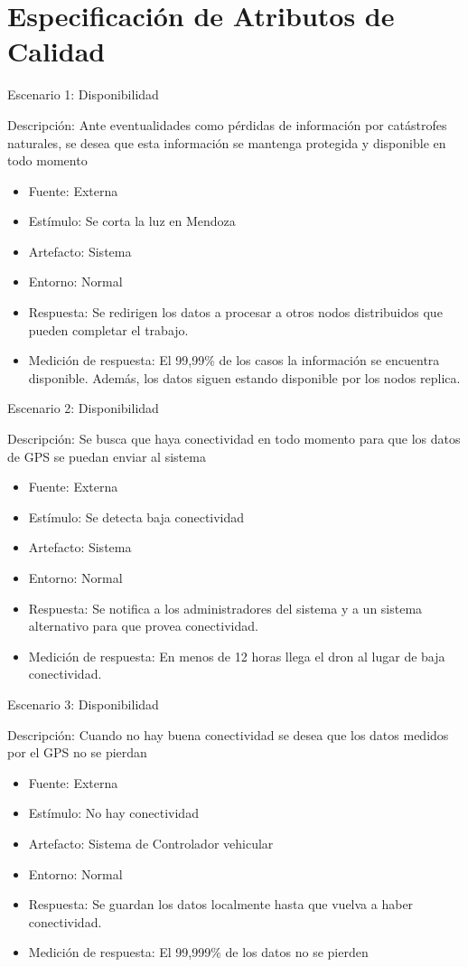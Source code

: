 \section{Especificación de Atributos de Calidad}

Escenario 1: Disponibilidad


Descripción: Ante eventualidades como pérdidas de información por catástrofes 
naturales, se desea que esta información se mantenga protegida y disponible en 
todo momento
\begin{itemize}
\item Fuente: Externa
\item Estímulo: Se corta la luz en Mendoza
\item Artefacto: Sistema
\item Entorno: Normal
\item Respuesta: Se redirigen los datos a procesar a otros nodos distribuidos que pueden completar el trabajo.  
\item Medición de respuesta: El 99,99\% de los casos la información se encuentra disponible. Además, los datos siguen estando disponible por los nodos replica.

\end{itemize} 

Escenario 2: Disponibilidad


Descripción: Se busca que haya conectividad en todo momento para que los datos de GPS se puedan enviar al sistema
\begin{itemize}
\item Fuente: Externa
\item Estímulo: Se detecta baja conectividad
\item Artefacto: Sistema
\item Entorno: Normal
\item Respuesta: Se notifica a los administradores del sistema y a un sistema alternativo para que provea conectividad.
\item Medición de respuesta: En menos de 12 horas llega el dron al lugar de baja conectividad.
\end{itemize} 

Escenario 3: Disponibilidad


Descripción: Cuando no hay buena conectividad se desea que los datos medidos por el GPS no se pierdan
\begin{itemize}
\item Fuente: Externa
\item Estímulo: No hay conectividad
\item Artefacto: Sistema de Controlador vehicular
\item Entorno: Normal
\item Respuesta: Se guardan los datos localmente hasta que vuelva a haber conectividad. 
\item Medición de respuesta: El 99,999\% de los datos no se pierden
\end{itemize} 


